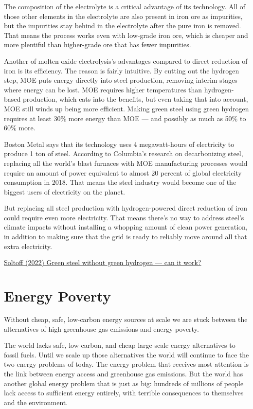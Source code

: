 \documentclass[
]{book}
\begin{document}
The composition of the electrolyte is a critical advantage of its technology. All of those other elements in the electrolyte are also present in iron ore as impurities, but the impurities stay behind in the electrolyte after the pure iron is removed. That means the process works even with low-grade iron ore, which is cheaper and more plentiful than higher-grade ore that has fewer impurities.

Another of molten oxide electrolysis's advantages compared to direct reduction of iron is its efficiency. The reason is fairly intuitive. By cutting out the hydrogen step, MOE puts energy directly into steel production, removing interim stages where energy can be lost. MOE requires higher temperatures than hydrogen-based production, which eats into the benefits, but even taking that into account, MOE still winds up being more efficient. Making green steel using green hydrogen requires at least 30\% more energy than MOE --- and possibly as much as 50\% to 60\% more.

Boston Metal says that its technology uses 4 megawatt-hours of electricity to produce 1 ton of steel.
According to Columbia's research on decarbonizing steel, replacing all the world's blast furnaces with MOE manufacturing processes would require an amount of power equivalent to almost 20 percent of global electricity consumption in 2018. That means the steel industry would become one of the biggest users of electricity on the planet.

But replacing all steel production with hydrogen-powered direct reduction of iron could require even more electricity. That means there's no way to address steel's climate impacts without installing a whopping amount of clean power generation, in addition to making sure that the grid is ready to reliably move around all that extra electricity.

\href{https://www.canarymedia.com/articles/clean-industry/green-steel-without-green-hydrogen-can-it-work}{Soltoff (2022) Green steel without green hydrogen --- can it work?}

\hypertarget{energy-poverty}{%
\chapter{Energy Poverty}\label{energy-poverty}}

Without cheap, safe, low-carbon energy sources at scale
we are stuck between the alternatives of high greenhouse gas emissions
and energy poverty.

The world lacks safe, low-carbon, and cheap large-scale energy alternatives to fossil fuels. Until we scale up those alternatives the world will continue to face the two energy problems of today. The energy problem that receives most attention is the link between energy access and greenhouse gas emissions. But the world has another global energy problem that is just as big: hundreds of millions of people lack access to sufficient energy entirely, with terrible consequences to themselves and the environment.
\end{document}
